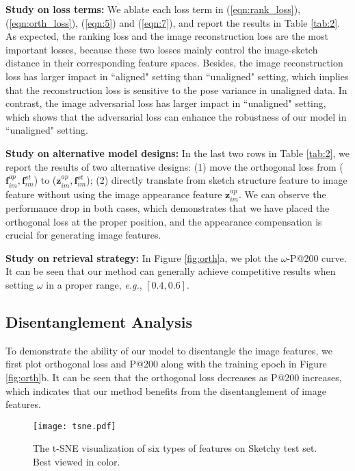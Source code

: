 \documentclass[10pt,twocolumn,letterpaper]{article}
\begin{document}
\noindent\textbf{Study on loss terms: }
We ablate each loss term in (\ref{eqn:rank_loss}), (\ref{eqn:orth_loss}), (\ref{eqn:5}) and (\ref{eqn:7}), and report the results in Table \ref{tab:2}. As expected, the ranking loss and the image reconstruction loss are the most important losses, because these two losses mainly control the image-sketch distance in their corresponding feature spaces. Besides, the image reconstruction loss has larger impact in ``aligned" setting than ``unaligned" setting, which implies that the reconstruction loss is sensitive to the pose variance in unaligned data. In contrast, the image adversarial loss has larger impact in ``unaligned" setting, which shows that the adversarial loss can enhance the robustness of our model in ``unaligned" setting.

\noindent\textbf{Study on alternative model designs: }
In the last two rows in Table \ref{tab:2}, we report the results of two alternative designs: (1) move the orthogonal loss from ($\mathbf{f}_{im}^{ap}, \mathbf{f}_{im}^{st}$) to ($\mathbf{z}_{im}^{ap},\mathbf{f}_{im}^{st}$); (2) directly translate from sketch structure feature to image feature without using the image appearance feature $\mathbf{z}_{im}^{ap}$. We can observe the performance drop in both cases, which demonstrates that we have placed the orthogonal loss at the proper position, and the appearance compensation is crucial for generating image features.

\noindent\textbf{Study on retrieval strategy: }
In Figure \ref{fig:orth}\color{red}a\color{black}, we plot the $\omega$-P@200 curve. It can be seen that our method can generally achieve competitive results when setting $\omega$ in a proper range, \emph{e.g.}, $[0.4, 0.6]$. 

\subsection{Disentanglement Analysis}
To demonstrate the ability of our model to disentangle the image features, we first plot orthogonal loss and P@200 along with the training epoch in Figure \ref{fig:orth}\color{red}b\color{black}. It can be seen that the orthogonal loss decreases as P@200 increases, which indicates that our method benefits from the disentanglement of image features.

\begin{figure}
\begin{center}
\texttt{[image: tsne.pdf]}
\end{center}
\vspace{-10pt}
   \caption{The t-SNE visualization of six types of features on Sketchy test set. Best viewed in color.}
\label{fig:tsne}
\vspace{-12pt}
\end{figure}
\end{document}
